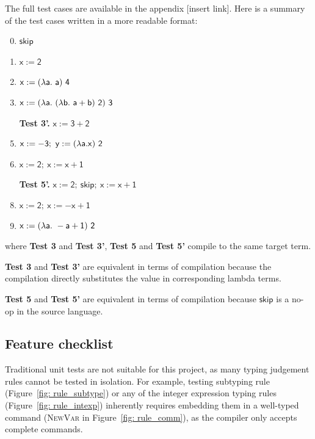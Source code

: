 \documentclass[12pt,twoside,a4paper]{report}
\theoremstyle{definition}
\theoremstyle{definition}
\theoremstyle{definition}
\theoremstyle{definition}
\begin{document}
    The full test cases are available in the appendix [insert link]. Here is a summary of the test cases written in a more readable format:
    \begin{enumerate}[label=\textbf{Test \arabic*.}, leftmargin=*]
        \setcounter{enumi}{-1}
        \item $\mathsf{skip}$
        \item $\mathsf{x := 2}$
        \item $\mathsf{x := (\mathnormal{\lambda} a.\ a)\ 4}$
        \item $\mathsf{x := (\mathnormal{\lambda} a.\ (\mathnormal{\lambda} b.\ a+b)\ 2)\ 3}$
        \item[\textbf{Test 3'.}] $\mathsf{x := 3 + 2}$
        \item $\mathsf{x := -3;\ y := (\mathnormal{\lambda} a. x)\ 2}$
        \item $\mathsf{x := 2;\ x := x + 1}$
        \item[\textbf{Test 5'.}] $\mathsf{x := 2;\ skip;\ x := x + 1}$
        \item $\mathsf{x := 2;\ x := -x + 1}$
        \item $\mathsf{x := (\mathnormal{\lambda} a.\ -a+1)\ 2}$
    \end{enumerate}
    where \textbf{Test 3} and \textbf{Test 3'}, \textbf{Test 5} and \textbf{Test 5'} compile to the same target term. 
    
    \textbf{Test 3} and \textbf{Test 3'} are equivalent in terms of compilation because the compilation directly substitutes the value in corresponding lambda terms. 
    
    \textbf{Test 5} and \textbf{Test 5'} are equivalent in terms of compilation because $\mathsf{skip}$ is a no-op in the source language.

    \subsection{Feature checklist}
    Traditional unit tests are not suitable for this project, as many typing judgement rules cannot be tested in isolation. For example, testing subtyping rule (Figure~\ref{fig: rule_subtype}) or any of the integer expression typing rules (Figure~\ref{fig: rule_intexp}) inherently requires embedding them in a well-typed command (\textsc{NewVar} in Figure~\ref{fig: rule_comm}), as the compiler only accepts complete commands. 
\end{document}

